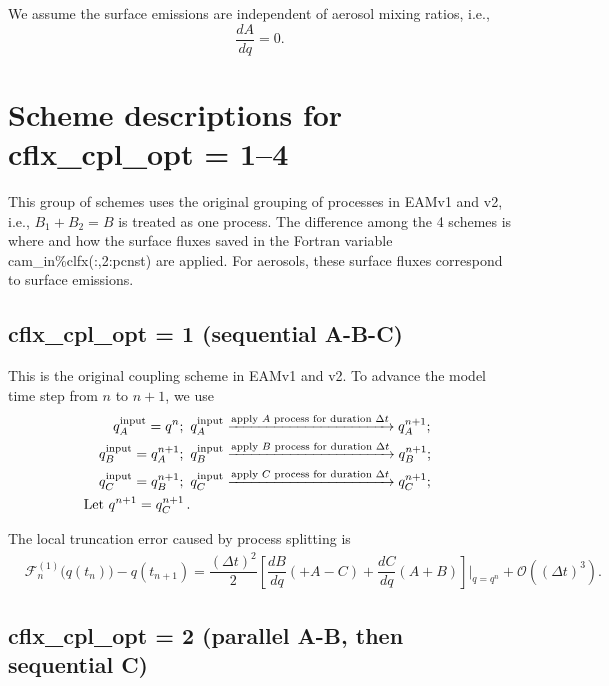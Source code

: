 \documentclass[12pt]{article}
\begin{document}
We assume the surface emissions are independent of aerosol mixing ratios, i.e.,
$$\frac{dA}{dq} = 0.$$


\section{Scheme descriptions for \sf cflx\_cpl\_opt = 1--4}

This group of schemes uses the original grouping of processes in EAMv1 and v2,
i.e., $B_1 + B_2 = B$ is treated as one process.
The  difference among the 4 schemes is where and how the surface fluxes saved
in the Fortran variable {\sf cam\_in\%clfx(:,2:pcnst)} are applied.
For aerosols, these surface fluxes correspond to surface emissions.

\subsection{{\sf cflx\_cpl\_opt = 1} (sequential A-B-C)}

This is the original coupling scheme in EAMv1 and v2.
To advance the model time step from $n$ to $n+1$, we use
%
\begin{align*}
q^{\rm input}_{A} = q^n;  \,\,\,
& q^{\rm input}_{A} \xrightarrow{\text{apply $A$ process for duration $\Delta t$}} q^{n+1}_{A};\\
%
q^{\rm input}_{B} = q^{n+1}_{A}; \,\,\,
& q^{\rm input}_{B} \xrightarrow{\text{apply $B$ process for duration $\Delta t$}} q^{n+1}_{B};\,\, 
 \\
%
q^{\rm input}_{C} = q^{n+1}_{B};  \,\,\,
&  q^{\rm input}_{C} \xrightarrow{\text{apply $C$ process for duration $\Delta t$}} q^{n+1}_{C};\,\,
\\
%
\text{Let}\,\, q^{n+1} = q^{n+1}_{C} \,.
%
\end{align*}

The local truncation error caused by process splitting is
\begin{align}
&\mathcal{F}_n^{(1)}\Big(q(t_n)\Big) - q(t_{n+1}) 
= \dfrac{(\Delta t)^2}{2}\left[  \dfrac{dB}{dq}(+A-C) + \dfrac{dC}{dq}(A+B)\right]\bigg|_{q=q^n}
+\mathcal{O}\left( (\Delta t)^3\right).
\end{align}


\subsection{{\sf cflx\_cpl\_opt = 2} (parallel A-B, then sequential C)}
\end{document}
